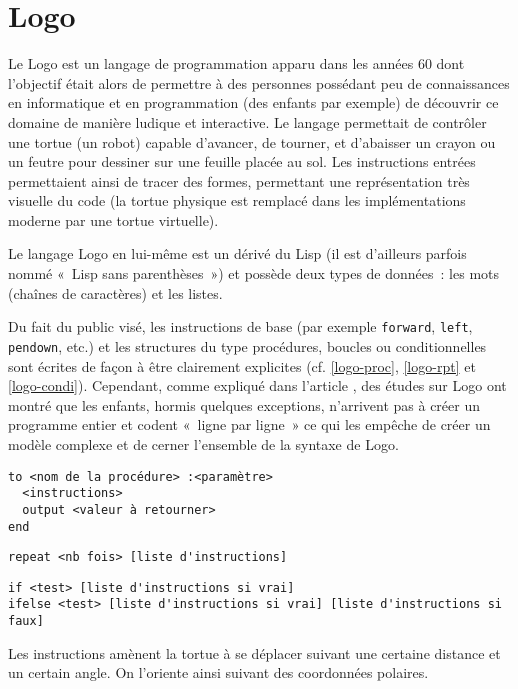 \section{Logo}
\label{Logo}

Le Logo est un langage de programmation apparu dans les années 60 dont l'objectif était alors de permettre à des personnes possédant peu de connaissances en informatique et en programmation (des enfants par exemple) de découvrir ce domaine de manière ludique et interactive. Le langage permettait de contrôler une tortue (un robot) capable d'avancer, de tourner, et d'abaisser un crayon ou un feutre pour dessiner sur une feuille placée au sol. Les instructions entrées permettaient ainsi de tracer des formes, permettant une représentation très visuelle du code (la tortue physique est remplacé dans les implémentations moderne par une tortue virtuelle).

Le langage Logo en lui-même est un dérivé du Lisp (il est d'ailleurs parfois nommé «~Lisp sans parenthèses~») et possède deux types de données~: les mots (chaînes de caractères) et les listes.

Du fait du public visé, les instructions de base (par exemple \verb|forward|, \verb|left|, \verb|pendown|, etc.) et les structures du type procédures, boucles ou conditionnelles sont écrites de façon à être clairement explicites (cf. \ref{logo-proc}, \ref{logo-rpt} et \ref{logo-condi}).
Cependant, comme expliqué dans l'article \cite{Logo}, des études sur Logo ont montré que les enfants, hormis quelques exceptions, n'arrivent pas à créer un programme entier et codent «~ligne par ligne~» ce qui les empêche de créer un modèle complexe et de cerner l'ensemble de la syntaxe de Logo.

\begin{lstlisting}[language=Logo,label=logo-proc,caption=Procédure en Logo]
to <nom de la procédure> :<paramètre>
  <instructions>
  output <valeur à retourner>
end
\end{lstlisting}

\begin{lstlisting}[language=Logo,label=logo-rpt,caption=Boucle en Logo]
repeat <nb fois> [liste d'instructions]
\end{lstlisting}

\begin{lstlisting}[language=Logo,label=logo-condi,caption=Conditionnelles en Logo]
if <test> [liste d'instructions si vrai]
ifelse <test> [liste d'instructions si vrai] [liste d'instructions si faux]
\end{lstlisting}

Les instructions amènent la tortue à se déplacer suivant une certaine distance et un certain angle. On l'oriente ainsi suivant des coordonnées polaires.
